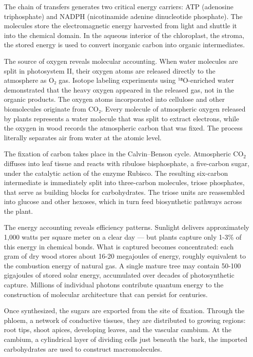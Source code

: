The chain of transfers generates two critical energy carriers: ATP (adenosine triphosphate) and NADPH (nicotinamide adenine dinucleotide phosphate). The molecules store the electromagnetic energy harvested from light and shuttle it into the chemical domain. In the aqueous interior of the chloroplast, the stroma, the stored energy is used to convert inorganic carbon into organic intermediates.

The source of oxygen reveals molecular accounting. When water molecules are split in photosystem II, their oxygen atoms are released directly to the atmosphere as O₂ gas. Isotope labeling experiments using ¹⁸O-enriched water demonstrated that the heavy oxygen appeared in the released gas, not in the organic products. The oxygen atoms incorporated into cellulose and other biomolecules originate from CO₂. Every molecule of atmospheric oxygen released by plants represents a water molecule that was split to extract electrons, while the oxygen in wood records the atmospheric carbon that was fixed. The process literally separates air from water at the atomic level.

The fixation of carbon takes place in the Calvin–Benson cycle. Atmospheric \(\mathrm{CO}_2\) diffuses into leaf tissue and reacts with ribulose bisphosphate, a five-carbon sugar, under the catalytic action of the enzyme Rubisco. The resulting six-carbon intermediate is immediately split into three-carbon molecules, triose phosphates, that serve as building blocks for carbohydrates. The triose units are reassembled into glucose and other hexoses, which in turn feed biosynthetic pathways across the plant.

The energy accounting reveals efficiency patterns. Sunlight delivers approximately 1,000 watts per square meter on a clear day — but plants capture only 1-3\% of this energy in chemical bonds. What is captured becomes concentrated: each gram of dry wood stores about 16-20 megajoules of energy, roughly equivalent to the combustion energy of natural gas. A single mature tree may contain 50-100 gigajoules of stored solar energy, accumulated over decades of photosynthetic capture. Millions of individual photons contribute quantum energy to the construction of molecular architecture that can persist for centuries.

Once synthesized, the sugars are exported from the site of fixation. Through the phloem, a network of conductive tissues, they are distributed to growing regions: root tips, shoot apices, developing leaves, and the vascular cambium. At the cambium, a cylindrical layer of dividing cells just beneath the bark, the imported carbohydrates are used to construct macromolecules.

